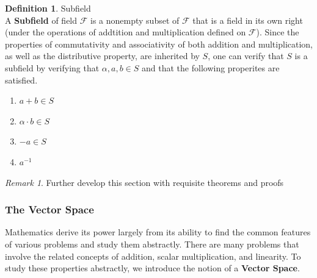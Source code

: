 \documentclass{book}
\theoremstyle{definition}
\newtheorem{definition}{Definition}[section]
\theoremstyle{remark}
\newtheorem{remark}{Remark}
\newcommand{\cc}[1]{\mathcal{#1}}
\newcommand{\m}{\cdot}
\begin{document}
\begin{definition}
Subfield \\

    A \textbf{Subfield} of field $\cc{F}$ is a nonempty subset of $\cc{F}$ that is a field in its own right (under the operations of addtition and multiplication defined on $\cc{F}$). Since the properties of commutativity and associativity of both addition and multiplication, as well as the distributive property, are inherited by $S$, one can verify that $S$ is a subfield by verifying that $\alpha, a, b \in S$ and that the following properites are satisfied.
        \begin{enumerate}
            \item $a + b \in S$
            \item $\alpha \m b \in S$
            \item $- a \in S$
            \item ${a}^{-1}$
        \end{enumerate}
    
    \begin{remark}
        Further develop this section with requisite theorems and proofs
    \end{remark}

\end{definition}


\newpage
\subsubsection{The Vector Space}
Mathematics derive its power largely from its ability to find the common features of various problems and study them abstractly. There are many problems that involve the related concepts of addition, scalar multiplication, and linearity. To study these properties abstractly, we introduce the notion of a \textbf{Vector Space}. 
\end{document}
